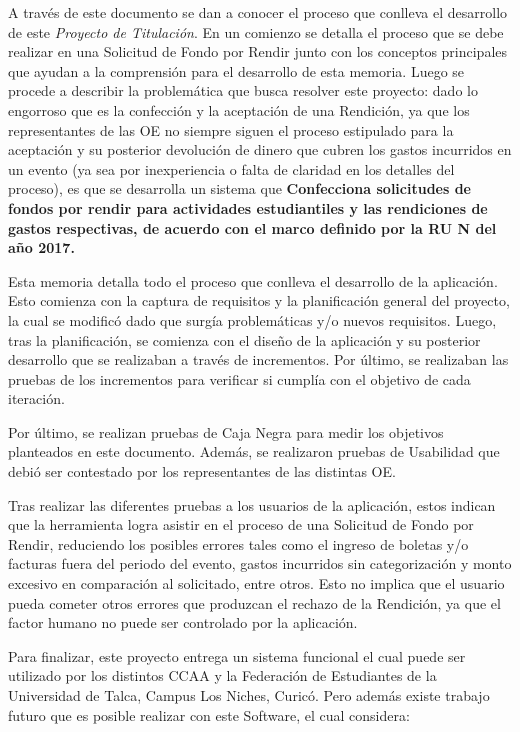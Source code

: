 A través de este documento se dan a conocer el proceso que conlleva el desarrollo de este \textit{Proyecto de Titulación}. En un comienzo se detalla el proceso que se debe realizar en una Solicitud de Fondo por Rendir junto con los conceptos principales que ayudan a la comprensión para el desarrollo de esta memoria. Luego se procede a describir la problemática que busca resolver este proyecto: dado lo engorroso que es la confección y la aceptación de una Rendición, ya que los representantes de las OE no siempre siguen el proceso estipulado para la aceptación y su posterior devolución de dinero que cubren los gastos  incurridos en un evento (ya sea por inexperiencia o falta de claridad en los detalles del proceso), es que se desarrolla un sistema que \textbf{Confecciona solicitudes de fondos por rendir para actividades estudiantiles y las rendiciones de gastos respectivas, de acuerdo con el marco definido por la RU N del año 2017.}

Esta memoria detalla todo el proceso que conlleva el desarrollo de la aplicación. Esto comienza con la captura de requisitos y la planificación general del proyecto, la cual se modificó dado que surgía problemáticas y/o nuevos requisitos. Luego, tras la planificación, se comienza con el diseño de la aplicación y su posterior desarrollo que se realizaban a través de incrementos. Por último, se realizaban las pruebas de los incrementos para verificar si cumplía con el objetivo de cada iteración.

Por último, se realizan pruebas de Caja Negra para medir los objetivos planteados en este documento. Además, se realizaron pruebas de Usabilidad que debió ser contestado por los representantes de las distintas OE.

Tras realizar las diferentes pruebas a los usuarios de la aplicación, estos indican que la herramienta logra asistir en el proceso de una Solicitud de Fondo por Rendir, reduciendo los posibles errores tales como el ingreso de boletas y/o facturas fuera del periodo del evento, gastos incurridos sin categorización y monto excesivo en comparación al solicitado, entre otros. Esto no implica que el usuario pueda cometer otros errores que produzcan el rechazo de la Rendición, ya que el factor humano no puede ser controlado por la aplicación. 

Para finalizar, este proyecto entrega un sistema funcional el cual puede ser utilizado por los distintos CCAA y la Federación de Estudiantes de la Universidad de Talca, Campus Los Niches, Curicó. Pero además existe trabajo futuro que es posible realizar con este Software, el cual considera:


